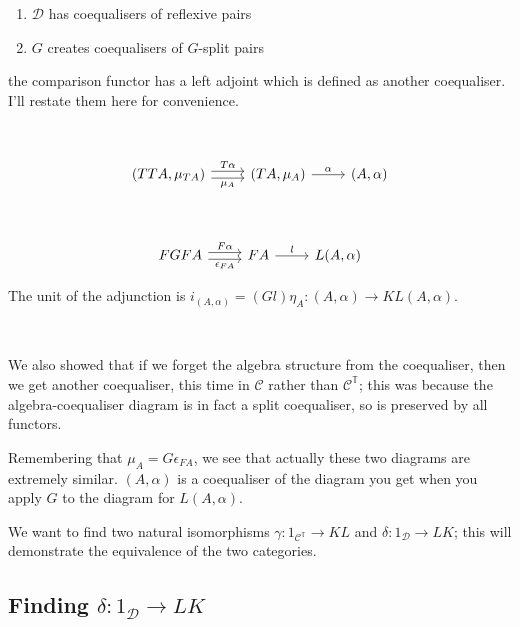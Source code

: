 \documentclass[11pt]{amsart}
\begin{document}
\begin{enumerate}
\item $\mathcal{D}$ has coequalisers of reflexive pairs
\item $G$ creates coequalisers of $G$-split pairs
\end{enumerate}
the comparison functor has a left adjoint which is defined as another coequaliser.
I'll restate them here for convenience.

\

\begin{thm}
\[
\begin{tikzcd}
(TTA, \mu_{TA}) \arrow[r, shift left, "T\alpha"] \arrow[r, shift right, "\mu_A"']
& (TA, \mu_A) \arrow[r, "\alpha"]
& (A, \alpha)
\end{tikzcd}
\]
\end{thm}

\

\begin{defn}[Adjoint $L$ of $K$]
\[
\begin{tikzcd}
FGFA
    \arrow[r, shift left, "F \alpha"]
    \arrow[r, shift right, "\epsilon_{F A}"']
& F A
    \arrow[r, "l"]
& L(A, \alpha)
\end{tikzcd}
\]

The unit of the adjunction is $i_{(A, \alpha)} = (Gl) \eta_A : (A, \alpha) \to KL(A, \alpha)$.
\end{defn}

\

We also showed that if we forget the algebra structure from the coequaliser, then we get another coequaliser, this time in $\mathcal{C}$ rather than $\mathcal{C}^{\mathbb{T}}$; this was because the algebra-coequaliser diagram is in fact a split coequaliser, so is preserved by all functors.

Remembering that $\mu_A = G \epsilon_{FA}$, we see that actually these two diagrams are extremely similar.
$(A, \alpha)$ is a coequaliser of the diagram you get when you apply $G$ to the diagram for $L(A, \alpha)$.

We want to find two natural isomorphisms $\gamma: 1_{\mathcal{C}^{\mathbb{T}}} \to KL$ and $\delta: 1_{\mathcal{D}} \to LK$; this will demonstrate the equivalence of the two categories.

\subsection{Finding \texorpdfstring{$\delta: 1_{\mathcal{D}} \to LK$}{delta}} \label{findingdelta}
\end{document}
